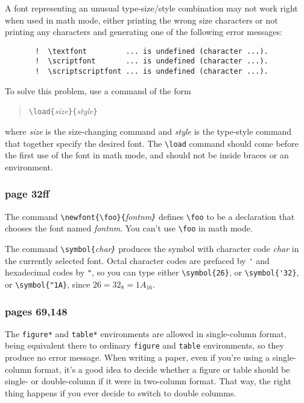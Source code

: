 A font representing an unusual type-size/style combination may not
work right when used in math mode, either printing the wrong size
characters or not printing any characters and generating one of the
following error messages:%
\begin{verbatim}
       !  \textfont         ... is undefined (character ...).
       !  \scriptfont       ... is undefined (character ...).
       !  \scriptscriptfont ... is undefined (character ...).
\end{verbatim}
To solve this problem, 
use a command of the form
\begin{quote}
\verb|\load{|{\it size\/}\verb|}{|{\it style\/}\verb|}|
\end{quote}
where {\it size\/} is the size-changing command and {\it style\/} is
the type-style command that together specify the desired font.
The \hbox{\verb|\load|} command should come before the first use of
the font in math mode, and should not be inside braces or an environment.


\subsubsection*{page 32ff}

The command \hbox{\verb|\newfont{\foo}{|\it fontnm\verb|}|} defines
\hbox{\verb|\foo|} to be a declaration that chooses the font named
{\it fontnm}.  You can't use \hbox{\verb|\foo|} in math mode.

The command \hbox{\verb|\symbol{|\it char\verb|}|} produces the
symbol with character code {\it char\/} in the currently selected
font.  Octal character codes are prefaced by \hbox{\verb|'|} and
hexadecimal codes by \hbox{\verb|"|}, so you can type either
\hbox{\verb|\symbol{26}|}, or \hbox{\verb|\symbol{'32}|}, or
\hbox{\verb|\symbol{"1A}|}, since $26 = 32_{8} = 1A_{16}$.

\subsubsection*{pages 69,148}

The \hbox{\verb|figure*|} and \hbox{\verb|table*|} environments are
allowed in single-column format, being equivalent there to ordinary
\hbox{\verb|figure|} and \hbox{\verb|table|} environments, so they
produce no error message.  When writing a paper, even if you're using
a single-column format, it's a good idea to decide whether a figure or
table should be single- or double-column if it were in two-column
format.  That way, the right thing happens if you ever decide to
switch to double columms.

